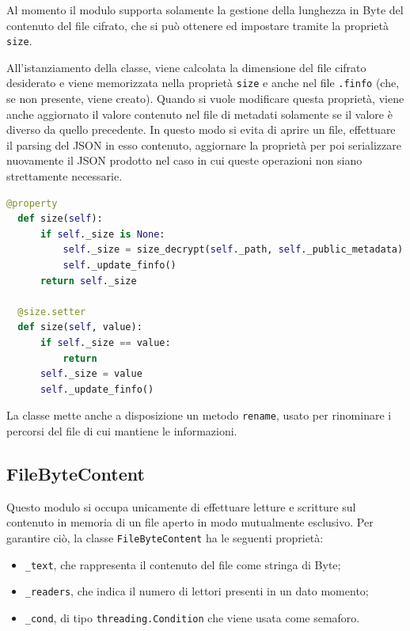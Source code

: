 \documentclass[a4paper,12pt,twoside,openright]{report}
\begin{document}
  Al momento il modulo supporta solamente la gestione della lunghezza in Byte del contenuto del file cifrato,
  che si può ottenere ed impostare tramite la proprietà \texttt{size}.
  
  All'istanziamento della classe, viene calcolata la dimensione del file cifrato desiderato e
  viene memorizzata nella proprietà \texttt{size} e anche nel file \texttt{.finfo} (che, se non presente, viene creato).
  Quando si vuole modificare questa proprietà, viene anche aggiornato il valore contenuto nel file
  di metadati solamente se il valore è diverso da quello precedente. In questo modo si evita
  di aprire un file, effettuare il parsing del JSON in esso contenuto, aggiornare la proprietà per poi
  serializzare nuovamente il JSON prodotto nel caso in cui queste operazioni non siano
  strettamente necessarie.
  \begin{lstlisting}[language=Python]
  @property
  def size(self):
      if self._size is None:
          self._size = size_decrypt(self._path, self._public_metadata)
          self._update_finfo()
      return self._size

  @size.setter
  def size(self, value):
      if self._size == value:
          return
      self._size = value
      self._update_finfo()
  \end{lstlisting}

  La classe mette anche a disposizione un metodo \texttt{rename}, usato per rinominare i
  percorsi del file di cui mantiene le informazioni.

  \subsection{FileByteContent}
  \label{section-filebytecontent}

  Questo modulo si occupa unicamente di effettuare letture e scritture sul contenuto
  in memoria di un file aperto in modo mutualmente esclusivo.
  Per garantire ciò, la classe \texttt{FileByteContent} ha le seguenti proprietà:
  \begin{itemize}
    \item \texttt{\_text}, che rappresenta il contenuto del file come stringa di Byte;
    \item \texttt{\_readers}, che indica il numero di lettori presenti in un dato momento;
    \item \texttt{\_cond}, di tipo \texttt{threading.Condition} che viene usata come semaforo.
  \end{itemize}
\end{document}
